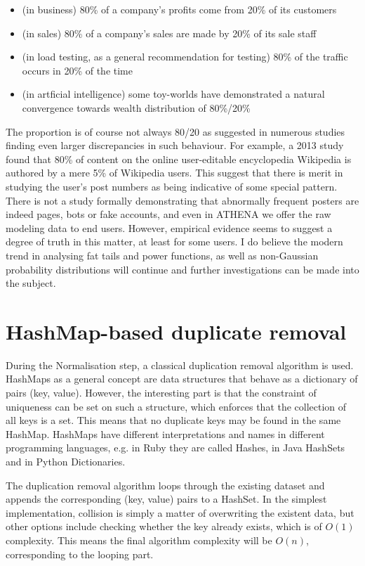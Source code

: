 \begin{itemize}
\item (in business) 80\% of a company's profits come from 20\% of its customers
\item (in sales) 80\% of a company's sales are made by 20\% of its sale staff
\item (in load testing, as a general recommendation for testing) 80\% of the traffic occurs in 20\% of the time
\item (in artficial intelligence) some toy-worlds have demonstrated a natural convergence towards wealth distribution of 80\%/20\%
\end{itemize}

The proportion is of course not always 80/20 as suggested in numerous studies finding even larger discrepancies in such behaviour. For example, a 2013 study \cite{muchnik2013origins} found that 80\% of content on the online user-editable encyclopedia Wikipedia is authored by a mere 5\% of Wikipedia users. This suggest that there is merit in studying the user's post numbers as being indicative of some special pattern. There is not a study formally demonstrating that abnormally frequent posters are indeed pages, bots or fake accounts, and even in ATHENA we offer the raw modeling data to end users. However, empirical evidence seems to suggest a degree of truth in this matter, at least for some users. I do believe the modern trend in analysing fat tails and power functions, as well as non-Gaussian probability distributions will continue and further investigations can be made into the subject.

\section{HashMap-based duplicate removal}
During the Normalisation step, a classical duplication removal algorithm is used. HashMaps as a general concept are data structures that behave as a dictionary of pairs (key, value). However, the interesting part is that the constraint of uniqueness can be set on such a structure, which enforces that the collection of all keys is a set. This means that no duplicate keys may be found in the same HashMap. HashMaps have different interpretations and names in different programming languages, e.g. in Ruby they are called Hashes, in Java HashSets and in Python Dictionaries.

The duplication removal algorithm loops through the existing dataset and appends the corresponding (key, value) pairs to a HashSet. In the simplest implementation, collision is simply a matter of overwriting the existent data, but other options include checking whether the key already exists, which is of $O(1)$ complexity. This means the final algorithm complexity will be $O(n)$, corresponding to the looping part.

